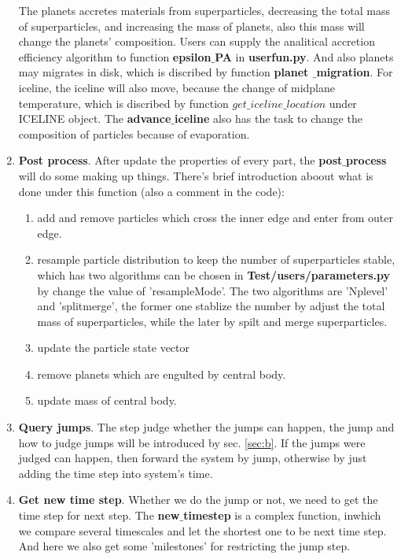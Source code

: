\documentclass[12pt]{article}
\begin{document}
\begin{enumerate}
        The planets accretes materials from superparticles, decreasing 
        the total mass of superparticles, and increasing the mass of planets, also this 
        mass will change the planets' composition. Users can supply the analitical accretion 
        efficiency algorithm to function \textbf{epsilon$\_$PA} in \textbf{userfun.py}. And 
        also planets may migrates in disk, which is discribed by function \textbf{planet
        $\_$migration}. For iceline, the iceline will also move, because the change of 
        midplane temperature, which is discribed by function \textbf{$get\_iceline\_location$} 
        under ICELINE object. The \textbf{advance$\_$iceline} also has the task to 
        change the composition of particles because of evaporation. 
    \item \textbf{Post process}. After update the properties of every part, the \textbf{post$\_$process}
        will do some making up things. There's brief introduction aboout what is done under 
        this function (also a comment in the code):
        \begin{enumerate}
            \item add and remove particles which cross the inner edge and enter from 
                outer edge. 
            \item resample particle distribution to keep the number of superparticles 
                stable, which 
                has two algorithms can be chosen in \textbf{Test/users/parameters.py} by change 
                the value of 'resampleMode'. The two algorithms are 
                'Nplevel' and 'splitmerge', the former one stablize the number by adjust 
                the total mass of superparticles, while the later by spilt and merge 
                superparticles.
            \item update the particle state vector
            \item remove planets which are engulted by central body. 
            \item update mass of central body.
        \end{enumerate}
    \item \textbf{Query jumps}. 
        The step judge whether the jumps can happen, the jump and how to 
        judge jumps will be introduced by sec. \ref{sec:b}. If the jumps were judged 
        can happen, then forward the system by jump, otherwise by just adding the 
        time step into system's time. 

    \item \textbf{Get new time step}. Whether we do the jump or not, we need to get the time step 
        for next step. The \textbf{new$\_$timestep} is a complex function, inwhich we 
        compare several timescales and let the shortest one to be next time step. 
        And here we also get some 'milestones' for restricting the jump step. 


\end{enumerate}
\end{document}
